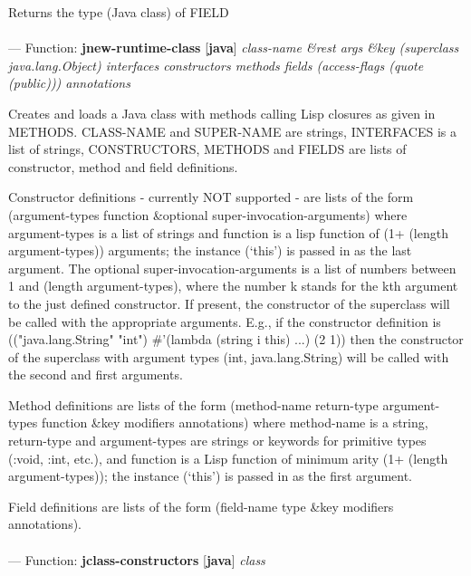 \begin{adjustwidth}{5em}{5em}
Returns the type (Java class) of FIELD
\end{adjustwidth}

\paragraph{}
\label{JAVA:JNEW-RUNTIME-CLASS}
--- Function: \textbf{jnew-runtime-class} [\textbf{java}] \textit{class-name \&rest args \&key (superclass java.lang.Object) interfaces constructors methods fields (access-flags (quote (public))) annotations}

\begin{adjustwidth}{5em}{5em}
Creates and loads a Java class with methods calling Lisp closures
   as given in METHODS.  CLASS-NAME and SUPER-NAME are strings,
   INTERFACES is a list of strings, CONSTRUCTORS, METHODS and FIELDS are
   lists of constructor, method and field definitions.

   Constructor definitions - currently NOT supported - are lists of the form
   (argument-types function \&optional super-invocation-arguments)
   where argument-types is a list of strings and function is a lisp function of
   (1+ (length argument-types)) arguments; the instance (`this') is passed in as
   the last argument. The optional super-invocation-arguments is a list of numbers
   between 1 and (length argument-types), where the number k stands for the kth argument
   to the just defined constructor. If present, the constructor of the superclass
   will be called with the appropriate arguments. E.g., if the constructor definition is
   (("java.lang.String" "int") \#'(lambda (string i this) ...) (2 1))
   then the constructor of the superclass with argument types (int, java.lang.String) will
   be called with the second and first arguments.

   Method definitions are lists of the form
   (method-name return-type argument-types function \&key modifiers annotations)
   where method-name is a string, return-type and argument-types are strings or keywords for
   primitive types (:void, :int, etc.), and function is a Lisp function of minimum arity
   (1+ (length argument-types)); the instance (`this') is passed in as the first argument.

   Field definitions are lists of the form (field-name type \&key modifiers annotations).
\end{adjustwidth}

\paragraph{}
\label{JAVA:JCLASS-CONSTRUCTORS}
--- Function: \textbf{jclass-constructors} [\textbf{java}] \textit{class}

